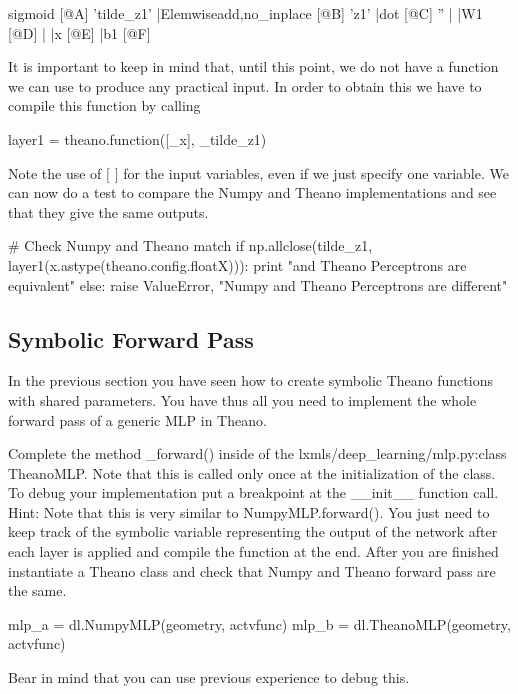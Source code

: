 \begin{exercise}
\begin{python}
sigmoid [@A] 'tilde_z1'
 |Elemwise{add,no_inplace} [@B] 'z1'
   |dot [@C] ''
   | |W1 [@D]
   | |x [@E]
   |b1 [@F]

\end{python}
It is important to keep in mind that, until this point, we do not have a
function we can use to produce any practical input. In order to obtain this we
have to compile this function by calling    
\begin{python}
layer1 = theano.function([_x], _tilde_z1)
\end{python}
Note the use of $[$ $]$ for the input variables, even if we just specify one
variable. We can now do a test to compare the Numpy and Theano implementations
and see that they give the same outputs.
\begin{python}
# Check Numpy and Theano match
if np.allclose(tilde_z1, layer1(x.astype(theano.config.floatX))):
    print "\nNumpy and Theano Perceptrons are equivalent"
else:
    raise ValueError, "Numpy and Theano Perceptrons are different"
\end{python}
\end{exercise}

\subsection{Symbolic Forward Pass}
In the previous section you have seen how to create symbolic Theano functions
with shared parameters. You have thus all you need to implement the whole
forward pass of a generic MLP in Theano.
\begin{exercise}
Complete the method \_forward() inside of the lxmls/deep\_learning/mlp.py:class
TheanoMLP. Note that this is called only once at the initialization of the
class. To debug your implementation put a breakpoint at the \_\_init\_\_
function call. Hint: Note that this is very similar to NumpyMLP.forward().
You just need to keep track of the symbolic variable representing the output of
the network after each layer is applied and compile the function at the end.
After you are finished instantiate a Theano class and check that Numpy and
Theano forward pass are the same. 

\begin{python}
mlp_a = dl.NumpyMLP(geometry, actvfunc)
mlp_b = dl.TheanoMLP(geometry, actvfunc)
\end{python}

Bear in mind that you can use previous experience to debug this.

\end{exercise}

